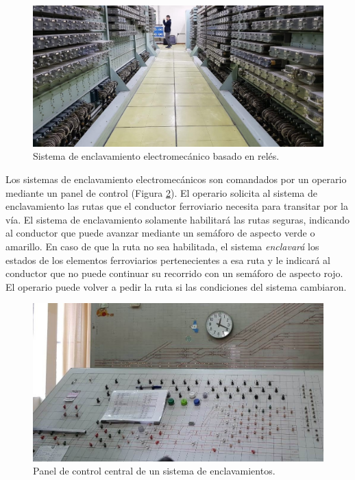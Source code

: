     \begin{figure}[H]
        \centering
        \includegraphics[width=1\textwidth]{Figuras/relees.jpg}
        \centering\caption{Sistema de enclavamiento electromecánico basado en relés.}
        \label{fig:enclavamiento_2}
    \end{figure} 
    
    Los sistemas de enclavamiento electromecánicos son comandados por un operario mediante un panel de control (Figura \ref{fig:enclavamiento_3}). El operario solicita al sistema de enclavamiento las rutas que el conductor ferroviario necesita para transitar por la vía. El sistema de enclavamiento solamente habilitará las rutas seguras, indicando al conductor que puede avanzar mediante un semáforo de aspecto verde o amarillo. En caso de que la ruta no sea habilitada, el sistema \textit{enclavará} los estados de los elementos ferroviarios pertenecientes a esa ruta y le indicará al conductor que no puede continuar su recorrido con un semáforo de aspecto rojo. El operario puede volver a pedir la ruta si las condiciones del sistema cambiaron.
    
    \begin{figure}[H]
        \centering
        \includegraphics[width=1\textwidth]{Figuras/llavallol.jpg}
        \centering\caption{Panel de control central de un sistema de enclavamientos.}
        \label{fig:enclavamiento_3}
    \end{figure}

